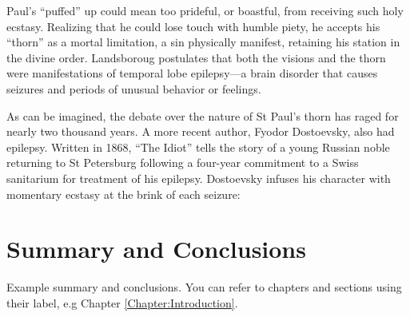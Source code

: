 \documentclass{UIdahoMastersThesis}
\begin{document}
Paul's ``puffed'' up could mean too prideful, or boastful, from receiving such holy ecstasy. Realizing that he could lose touch with humble piety, he accepts his ``thorn'' as a mortal limitation, a sin physically manifest, retaining his station in the divine order. Landsboroug postulates that both the visions and the thorn were manifestations of temporal lobe epilepsy---a brain disorder that causes seizures and periods of unusual behavior or feelings.

As can be imagined, the debate over the nature of St Paul's thorn has raged for nearly two thousand years. A more recent author, Fyodor Dostoevsky, also had epilepsy. Written in 1868, ``The Idiot'' tells the story of a young Russian noble returning to St Petersburg following a four-year commitment to a Swiss sanitarium for treatment of his epilepsy. Dostoevsky infuses his character with momentary ecstasy at the brink of each seizure:

\chapter{Summary and Conclusions}
\label{Chapter:SummaryAndConclusions}

Example summary and conclusions. You can refer to chapters and sections using their label, e.g Chapter \ref{Chapter:Introduction}.





\clearpage
\renewcommand\bibname{References} %
\addcontentsline{toc}{chapter}{\textsc{\bibname}} %

\end{document}
